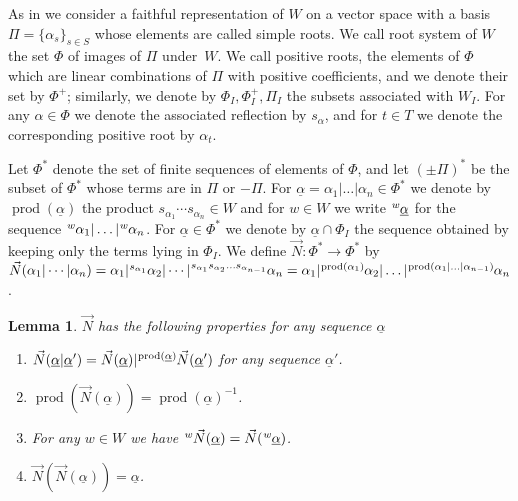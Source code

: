 \documentclass{amsart}
\numberwithin{equation}{section}
\newtheorem{lemma}[equation]{Lemma}
\newcommand\vN{\vec N}
\newcommand\lexp[2]{\kern\scriptspace\vphantom{#2}^{#1}\kern-\scriptspace#2}
\newcommand\inv{^{-1}}
\DeclareMathOperator\product{prod}
\begin{document}
As in \cite[Chapter V, \S 4]{Bbk} we consider a faithful representation of $W$
on  a vector space with a basis $\Pi=\{\alpha_s\}_{s\in S}$ whose elements are
called simple roots. We call root system of $W$ the set  $ \Phi$ of images of $\Pi$ under~$W$. We call
positive  roots, the elements of $\Phi$ which are linear combinations of $\Pi$
with positive coefficients, and we denote their set by $\Phi^+$; similarly, we
denote   by
$\Phi_I,\Phi_I^+,\Pi_I$ the subsets associated with $W_I$. For any
$\alpha\in\Phi$ we denote the associated reflection by
 $s_\alpha$, and for $t\in T$ we denote the
corresponding positive root by  $\alpha_t$.

Let  $\Phi^*$ denote the set of finite sequences of elements of $\Phi$, and let
 $(\pm\Pi)^*$ be  the subset of $\Phi^*$
whose  terms  are  in  $\Pi$ or $-\Pi$.  
For   $\underline\alpha=\alpha_1|\ldots|\alpha_n\in\Phi^*$  we  denote by
\index{prod@$\product(\underline\alpha)$} $\product(\underline\alpha)$      the      product      $s_{\alpha_1}\cdots
s_{\alpha_n}\in  W$ and for $w\in  W$ we write $\lexp w{\underline\alpha}$ 
for the sequence
$\lexp  w{\alpha_1}|\ldots|\lexp w{\alpha_n}$.  For $\underline\alpha\in
\Phi^*$  we denote by $\underline\alpha\cap\Phi_I$
the sequence obtained by keeping only the terms lying in $\Phi_I$.
We define \index{N@$\vN$} $\vN:\Phi^*\to \Phi^*$ by $\vN(\alpha_1|\cdots|\alpha_n)=
\alpha_1|\lexp{s_{\alpha_1}}{\alpha_2}|
\cdots|\lexp{s_{\alpha_1}s_{\alpha_2}\ldots s_{\alpha_{n-1}}}{\alpha_n}=
\alpha_1|\lexp{\product(\alpha_1)}\alpha_2|\ldots|
\lexp{\product(\alpha_1|\ldots|\alpha_{n-1})}\alpha_n$. 
\begin{lemma}\label{vecN} $\vN$ has the following properties for any sequence $\underline\alpha$
\begin{enumerate}
\item $\vN(\underline\alpha|\underline\alpha')=\vN(\underline\alpha)|\lexp{\product(\underline\alpha)}\vN(\underline\alpha')$
for any sequence $\underline\alpha'$.
\item $\product(\vN(\underline\alpha))=\product(\underline\alpha)\inv$.
\item For any $w\in W$ we have $\lexp
 w\vN(\underline\alpha)=\vN(\lexp w{\underline\alpha})$.
\item $\vN(\vN(\underline\alpha))=\underline\alpha$.
\end{enumerate}
\end{lemma}
\end{document}
